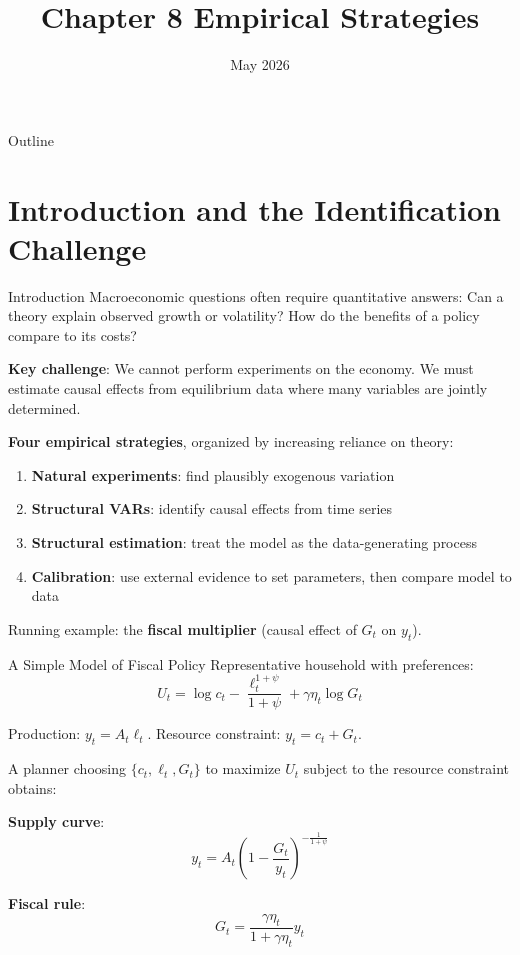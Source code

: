 \documentclass[blue]{beamer}
\title[Chapter8]{Chapter 8 Empirical Strategies}
\author[]{}
\date[May 2026]{May 2026}
\begin{document}
  \frame
  {
    \titlepage
  }


\begin{frame}{Outline}
	\tableofcontents
\end{frame}


\section{Introduction and the Identification Challenge}

\begin{frame}{Introduction}
	Macroeconomic questions often require quantitative answers: Can a theory explain observed growth or volatility? How do the benefits of a policy compare to its costs?
	
	\textbf{Key challenge}: We cannot perform experiments on the economy. We must estimate causal effects from equilibrium data where many variables are jointly determined.
	
	\textbf{Four empirical strategies}, organized by increasing reliance on theory:
	\vspace{-4pt}
	\begin{enumerate}
		\item \textbf{Natural experiments}: find plausibly exogenous variation
		\item \textbf{Structural VARs}: identify causal effects from time series
		\item \textbf{Structural estimation}: treat the model as the data-generating process
		\item \textbf{Calibration}: use external evidence to set parameters, then compare model to data
	\end{enumerate}
	
	Running example: the \textbf{fiscal multiplier} (causal effect of $G_t$ on $y_t$).
\end{frame}

\begin{frame}{A Simple Model of Fiscal Policy}
	Representative household with preferences:
	\[
	U_t = \log c_t - \frac{\ell_t^{1+\psi}}{1+\psi} + \gamma \eta_t \log G_t
	\]
	
	Production: $y_t = A_t \ell_t$. Resource constraint: $y_t = c_t + G_t$.
	
	\bigskip
	A planner choosing $\{c_t, \ell_t, G_t\}$ to maximize $U_t$ subject to the resource constraint obtains:
	
	\textbf{Supply curve}:
	\[
	y_t = A_t \left(1 - \frac{G_t}{y_t}\right)^{-\frac{1}{1+\psi}}
	\]
	
	\textbf{Fiscal rule}:
	\[
	G_t = \frac{\gamma \eta_t}{1 + \gamma \eta_t} y_t
	\]
\end{frame}
\end{document}
